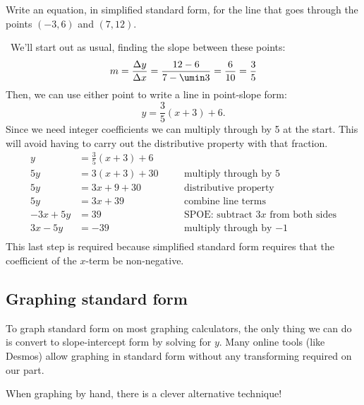 \begin{boxex}
Write an equation, in simplified standard form, for the line that goes through the points $(-3, 6)$ and $(7, 12)$.

\exsoln\ We'll start out as usual, finding the slope between these points: \[m=\frac{\Delta y}{\Delta x} = \frac{12-6}{7-\umin3} = \frac{6}{10} = \frac{3}{5}\]
Then, we can use either point to write a line in point-slope form: \[y=\frac{3}{5}(x+3)+6.\] Since we need integer coefficients we can multiply through by 5 at the start. This will avoid having to carry out the distributive property with that fraction.
\[\begin{aligned}
y &= \frac{3}{5}(x+3)+6\\
5y &= 3(x+3)+30
&& \quad\text{multiply through by 5}\\
5y &= 3x+9+30
&& \quad\text{distributive property}\\
5y &= 3x+39
&& \quad\text{combine line terms}\\
-3x + 5y &= 39
&& \quad\text{SPOE: subtract $3x$ from both sides}\\
3x - 5y &= -39
&& \quad\text{multiply through by $-1$}\\
\end{aligned}\]
This last step is required because simplified standard form requires that the coefficient of the $x$-term be non-negative.
\end{boxex}

\subsection{Graphing standard form}

To graph standard form on most graphing calculators, the only thing we can do is convert to slope-intercept form by solving for $y$. Many online tools (like Desmos) allow graphing in standard form without any transforming required on our part.

When graphing by hand, there is a clever alternative technique!

